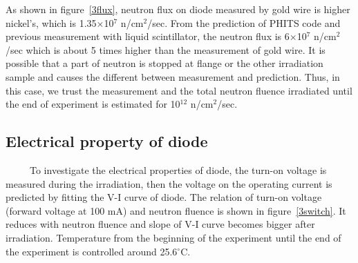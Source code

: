 As shown in figure~\ref{3flux}, neutron flux on diode measured by gold wire is higher nickel's, which is 1.35$\times$10$^7$ n/cm$^2$/sec.
From the prediction of PHITS code and previous measurement with liquid scintillator, the neutron flux is 6$\times$10$^7$ n/cm$^2$/sec which is about 5 times higher than the measurement of gold wire.
It is possible that a part of neutron is stopped at flange or the other irradiation sample and causes the different between measurement and prediction.
Thus, in this case, we trust the measurement and the total neutron fluence irradiated until the end of experiment is estimated for 10$^{12}$ n/cm$^2$/sec.

  \subsection{Electrical property of diode}
~~~~~To investigate the electrical properties of diode, the turn-on voltage is measured during the irradiation, then the voltage on the operating current is predicted by fitting the V-I curve of diode.
The relation of turn-on voltage (forward voltage at 100 mA) and neutron fluence is shown in figure~\ref{3switch}.
It reduces with neutron fluence and slope of V-I curve becomes bigger after irradiation.
Temperature from the beginning of the experiment until the end of the experiment is controlled around 25.6$^{\circ}$C.

